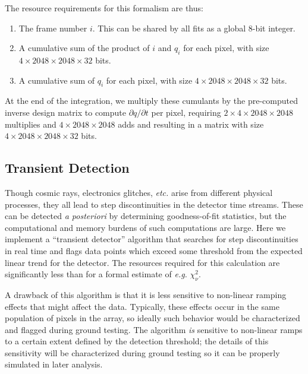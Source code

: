\documentclass{ws-jai}
\begin{document}
The resource requirements for this formalism are thus:
%
\begin{enumerate}
  \item The frame number $i$.  This can be shared by all fits as a
    global 8-bit integer.
  \item A cumulative sum of the product of $i$ and $q_{i}$ for each
    pixel, with size $4 \times 2048 \times 2048 \times 32$ bits.
  \item A cumulative sum of $q_{i}$ for each
    pixel, with size $4 \times 2048 \times 2048 \times 32$ bits.
\end{enumerate}
%
At the end of the integration, we multiply these cumulants by the
pre-computed inverse design matrix to compute
$\partial q / \partial t$ per pixel, requiring
$2 \times 4 \times 2048 \times 2048$ multiplies and
$4 \times 2048 \times 2048$ adds and resulting in a matrix with size
$4 \times 2048 \times 2048 \times 32$ bits.

\subsection{Transient Detection}

Though cosmic rays, electronics glitches, \textit{etc.} arise from
different physical processes, they all lead to step discontinuities in
the detector time streams.  These can be detected \textit{a
  posteriori} by determining goodness-of-fit statistics, but the
computational and memory burdens of such computations are large.  Here
we implement a ``transient detector'' algorithm that searches for step
discontinuities in real time and flags data points which exceed some
threshold from the expected linear trend for the detector.  The
resources required for this calculation are significantly less than
for a formal estimate of \textit{e.g.}  $\chi^{2}_{\nu}$.

A drawback of this algorithm is that it is less sensitive to
non-linear ramping effects that might affect the data.  Typically,
these effects occur in the same population of pixels in the array, so
ideally such behavior would be characterized and flagged during ground
testing.  The algorithm \emph{is} sensitive to non-linear ramps to a
certain extent defined by the detection threshold; the details of this
sensitivity will be characterized during ground testing so it can be
properly simulated in later analysis.
\end{document}
